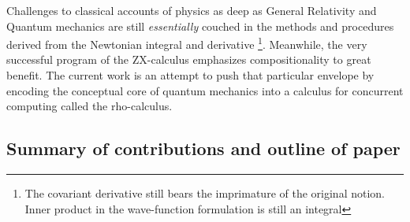 Challenges to classical accounts of physics as deep as General
Relativity \cite{Misner1973} and Quantum mechanics \cite{dirac1981principles}
are still \emph{essentially} couched in the methods and procedures
derived from the Newtonian integral and derivative \footnote{The
  covariant derivative still bears the imprimature of the original
  notion. Inner product in the wave-function formulation is still an
  integral}. Meanwhile, the very successful program of the ZX-calculus
emphasizes compositionality to great benefit. The current work is an
attempt to push that particular envelope by encoding the conceptual
core of quantum mechanics into a calculus for concurrent computing
called the rho-calculus.



\subsection{Summary of contributions and outline of paper}


